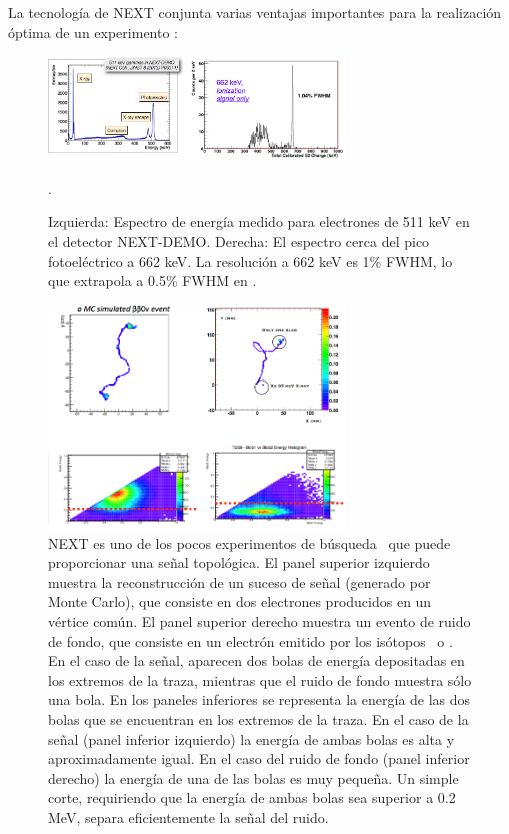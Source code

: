 La tecnología de NEXT conjunta varias ventajas importantes para la realización óptima de un experimento \bbonu:
                                    
\begin{figure}
\centering
\includegraphics[width=0.7\textwidth]{img/EResolution.png}
\caption{\small Izquierda: Espectro de energía medido para electrones de 511 keV en el detector NEXT-DEMO. Derecha: El espectro cerca del pico fotoeléctrico a 662 keV. La resolución a 662 keV es 1\% FWHM, lo que extrapola a 0.5\% FWHM en \Qbb.}
\label{fig.ERES}. 
\end{figure}

\begin{figure}
\centering
\includegraphics[width=0.7\textwidth]{img/Topo2.png}
\caption{\small NEXT es uno de los pocos experimentos de búsqueda \bbonu\ que puede proporcionar una señal topológica. El panel superior izquierdo muestra la reconstrucción de un suceso de señal (generado por Monte Carlo), que consiste en dos electrones producidos en un vértice común. El panel superior derecho muestra un evento de ruido de fondo, que consiste en un electrón emitido por los isótopos  \BI\ o \TL. En el caso de la señal, aparecen dos bolas de energía depositadas en los extremos de la traza, mientras que el ruido de fondo muestra sólo una bola. En los paneles inferiores se representa la energía de las dos bolas que se encuentran en los extremos de la traza. En el caso de la señal (panel inferior izquierdo) la energía de ambas bolas es alta y aproximadamente igual. En el caso del ruido de fondo (panel inferior derecho) la energía de una de las bolas es muy pequeña. Un simple corte, requiriendo que la energía de ambas bolas sea superior a 0.2 MeV, separa eficientemente la señal del ruido.}\label{fig.ETRK2}
\end{figure}

